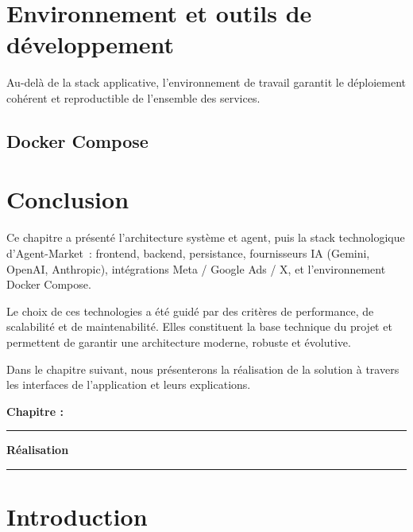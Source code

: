 \documentclass[12pt,a4paper]{report}
\numberwithin{figure}{chapter}
\numberwithin{table}{chapter}
\newcommand{\chapterpagetitle}[1]{%
  \vspace*{1.2cm}%
  {\noindent\fontsize{18}{22}\selectfont\bfseries\color{titlegreen} Chapitre \thechapter :}\par
  \vspace*{6.0cm}%
  \noindent\textcolor{darkgreen}{\rule{\textwidth}{2pt}}%
  \vspace{1.5cm}%
  \begin{center}
    {\fontsize{24}{28}\selectfont\bfseries\color{titlegreen} #1}%
  \end{center}
  \vspace{1.5cm}%
  \noindent\textcolor{darkgreen}{\rule{\textwidth}{2pt}}%
  \vfill
  \newpage
}
\begin{document}
\section{Environnement et outils de développement}

Au-delà de la stack applicative, l’environnement de travail garantit le déploiement cohérent et reproductible de l’ensemble des services.

\subsection{Docker Compose}


\section{Conclusion}

Ce chapitre a présenté l’architecture système et agent, puis la stack technologique d’Agent-Market~: frontend, backend, persistance, fournisseurs IA (Gemini, OpenAI, Anthropic), intégrations Meta / Google Ads / X, et l’environnement Docker Compose.

Le choix de ces technologies a été guidé par des critères de performance, de scalabilité et de maintenabilité. Elles constituent la base technique du projet et permettent de garantir une architecture moderne, robuste et évolutive.

Dans le chapitre suivant, nous présenterons la réalisation de la solution à travers les interfaces de l’application et leurs explications.

\newpage




\chapterpagetitle{Réalisation}


\section{Introduction}
\end{document}
